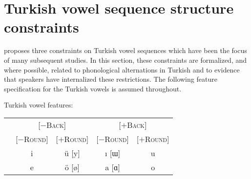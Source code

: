 \section{Turkish vowel sequence structure constraints}

\citet{Lees1966b,Lees1966a} 
proposes three constraints on Turkish vowel sequences which have been the focus of many subsequent studies. In this section, these constraints are formalized, and where possible, related to phonological alternations in Turkish and to evidence that speakers have internalized these restrictions. The following feature specification for the Turkish vowels is assumed throughout.

\begin{example}
Turkish vowel features:

\vspace{0.5\baselineskip}
\begin{tabular}{c | c c c c}
                       & \multicolumn{2}{c}{[$-$\textsc{Back}]} & \multicolumn{2}{c}{[$+$\textsc{Back}]} \\
                       & [$-$\textsc{Round}] & [$+$\textsc{Round}] & [$-$\textsc{Round}] & [$+$\textsc{Round}] \\ \midrule
{} & {i} & {ü} [y] & {ı} [ɯ] & {u} \\
 & {e} & {ö} [ø] & {a} [ɑ] & {o} \\
\end{tabular}
\end{example}




